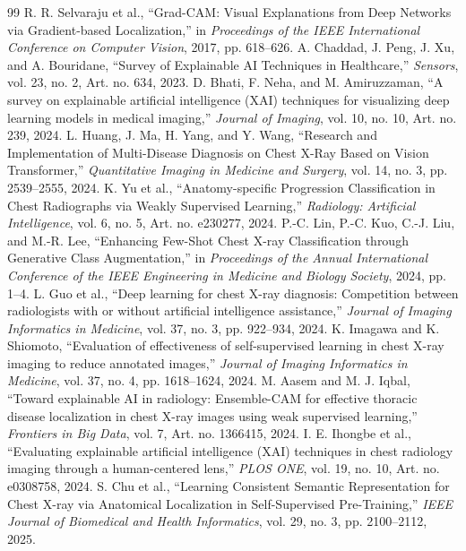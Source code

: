 \documentclass[12pt, oneside]{book}
\begin{document}
\begin{thebibliography}{99}
R. R. Selvaraju et al., ``Grad-CAM: Visual Explanations from Deep Networks via Gradient-based Localization,'' in \textit{Proceedings of the IEEE International Conference on Computer Vision}, 2017, pp. 618--626.
A. Chaddad, J. Peng, J. Xu, and A. Bouridane, ``Survey of Explainable AI Techniques in Healthcare,'' \textit{Sensors}, vol. 23, no. 2, Art. no. 634, 2023.
D. Bhati, F. Neha, and M. Amiruzzaman, ``A survey on explainable artificial intelligence (XAI) techniques for visualizing deep learning models in medical imaging,'' \textit{Journal of Imaging}, vol. 10, no. 10, Art. no. 239, 2024.
L. Huang, J. Ma, H. Yang, and Y. Wang, ``Research and Implementation of Multi-Disease Diagnosis on Chest X-Ray Based on Vision Transformer,'' \textit{Quantitative Imaging in Medicine and Surgery}, vol. 14, no. 3, pp. 2539--2555, 2024.
K. Yu et al., ``Anatomy-specific Progression Classification in Chest Radiographs via Weakly Supervised Learning,'' \textit{Radiology: Artificial Intelligence}, vol. 6, no. 5, Art. no. e230277, 2024.
P.-C. Lin, P.-C. Kuo, C.-J. Liu, and M.-R. Lee, ``Enhancing Few-Shot Chest X-ray Classification through Generative Class Augmentation,'' in \textit{Proceedings of the Annual International Conference of the IEEE Engineering in Medicine and Biology Society}, 2024, pp. 1--4.
L. Guo et al., ``Deep learning for chest X-ray diagnosis: Competition between radiologists with or without artificial intelligence assistance,'' \textit{Journal of Imaging Informatics in Medicine}, vol. 37, no. 3, pp. 922--934, 2024.
K. Imagawa and K. Shiomoto, ``Evaluation of effectiveness of self-supervised learning in chest X-ray imaging to reduce annotated images,'' \textit{Journal of Imaging Informatics in Medicine}, vol. 37, no. 4, pp. 1618--1624, 2024.
M. Aasem and M. J. Iqbal, ``Toward explainable AI in radiology: Ensemble-CAM for effective thoracic disease localization in chest X-ray images using weak supervised learning,'' \textit{Frontiers in Big Data}, vol. 7, Art. no. 1366415, 2024.
I. E. Ihongbe et al., ``Evaluating explainable artificial intelligence (XAI) techniques in chest radiology imaging through a human-centered lens,'' \textit{PLOS ONE}, vol. 19, no. 10, Art. no. e0308758, 2024.
S. Chu et al., ``Learning Consistent Semantic Representation for Chest X-ray via Anatomical Localization in Self-Supervised Pre-Training,'' \textit{IEEE Journal of Biomedical and Health Informatics}, vol. 29, no. 3, pp. 2100--2112, 2025.

\end{thebibliography}
\end{document}
